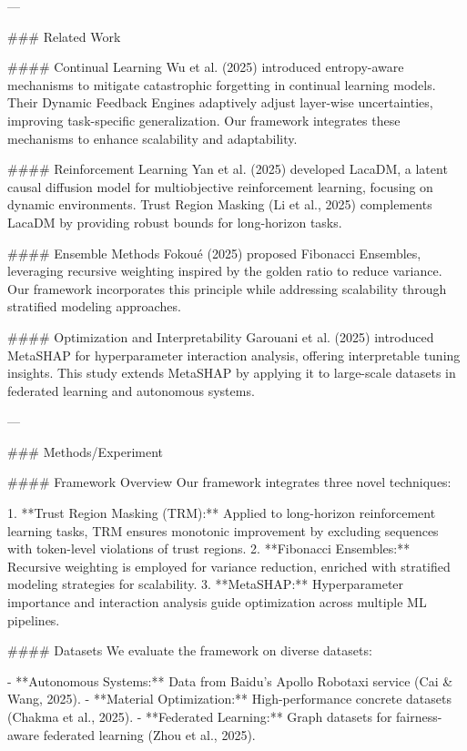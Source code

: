 ---

### Related Work  

#### Continual Learning  
Wu et al. (2025) introduced entropy-aware mechanisms to mitigate catastrophic forgetting in continual learning models. Their Dynamic Feedback Engines adaptively adjust layer-wise uncertainties, improving task-specific generalization. Our framework integrates these mechanisms to enhance scalability and adaptability.  

#### Reinforcement Learning  
Yan et al. (2025) developed LacaDM, a latent causal diffusion model for multiobjective reinforcement learning, focusing on dynamic environments. Trust Region Masking (Li et al., 2025) complements LacaDM by providing robust bounds for long-horizon tasks.  

#### Ensemble Methods  
Fokoué (2025) proposed Fibonacci Ensembles, leveraging recursive weighting inspired by the golden ratio to reduce variance. Our framework incorporates this principle while addressing scalability through stratified modeling approaches.  

#### Optimization and Interpretability  
Garouani et al. (2025) introduced MetaSHAP for hyperparameter interaction analysis, offering interpretable tuning insights. This study extends MetaSHAP by applying it to large-scale datasets in federated learning and autonomous systems.  

---

### Methods/Experiment  

#### Framework Overview  
Our framework integrates three novel techniques:  

1. **Trust Region Masking (TRM):** Applied to long-horizon reinforcement learning tasks, TRM ensures monotonic improvement by excluding sequences with token-level violations of trust regions.  
2. **Fibonacci Ensembles:** Recursive weighting is employed for variance reduction, enriched with stratified modeling strategies for scalability.  
3. **MetaSHAP:** Hyperparameter importance and interaction analysis guide optimization across multiple ML pipelines.  

#### Datasets  
We evaluate the framework on diverse datasets:  

- **Autonomous Systems:** Data from Baidu's Apollo Robotaxi service (Cai & Wang, 2025).  
- **Material Optimization:** High-performance concrete datasets (Chakma et al., 2025).  
- **Federated Learning:** Graph datasets for fairness-aware federated learning (Zhou et al., 2025).  

